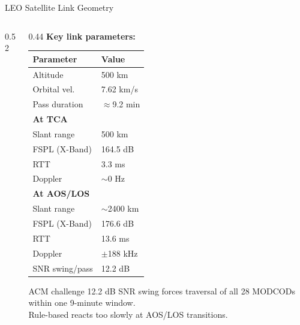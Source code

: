 \documentclass[aspectratio=169,10pt]{beamer}
\begin{document}
\begin{frame}[shrink=5]{LEO Satellite Link Geometry}
\begin{columns}[T]
\begin{column}{0.52\textwidth}
\begin{center}
\end{center}
\end{column}
\begin{column}{0.44\textwidth}
  \textbf{Key link parameters:}
  {\scriptsize
  \begin{tabular}{ll}
    \toprule
    \textbf{Parameter} & \textbf{Value}\\
    \midrule
    Altitude       & 500 km\\
    Orbital vel.   & 7.62 km/s\\
    Pass duration  & $\approx$9.2 min\\
    \midrule
    \textbf{At TCA} & \\
    Slant range    & 500 km\\
    FSPL (X-Band)  & 164.5 dB\\
    RTT            & 3.3 ms\\
    Doppler        & $\sim$0 Hz\\
    \midrule
    \textbf{At AOS/LOS} & \\
    Slant range    & $\sim$2400 km\\
    FSPL (X-Band)  & 176.6 dB\\
    RTT            & 13.6 ms\\
    Doppler        & $\pm$188 kHz\\
    \midrule
    SNR swing/pass & \alert{12.2 dB}\\
    \bottomrule
  \end{tabular}}

  \vspace{0.4em}
  \begin{keybox}{ACM challenge}
    \scriptsize 12.2 dB SNR swing forces traversal of all 28 MODCODs within one 9-minute window.\\
    Rule-based reacts too slowly at AOS/LOS transitions.
  \end{keybox}
\end{column}
\end{columns}
\end{frame}
\end{document}
